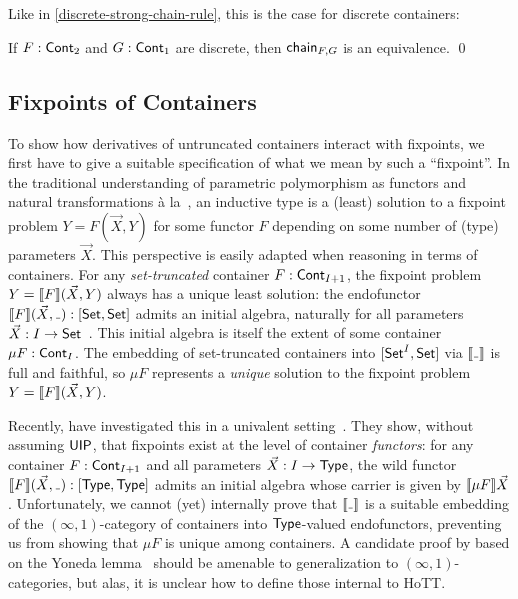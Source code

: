 Like in \autoref{discrete-strong-chain-rule}, this is the case for discrete containers:
\begin{proposition}\label{discrete-strong-binary-chain-rule}
  If \( F : \operatorname{\mathsf{Cont}}_{2} \) and \( G : \operatorname{\mathsf{Cont}}_{1} \) are discrete, then \( \operatorname{\mathsf{chain}}_{F,G} \) is an equivalence. \qed
\end{proposition}

\subsection{Fixpoints of Containers}\label{fixed-point-containers}

To show how derivatives of untruncated containers interact with fixpoints,
we first have to give a suitable specification of what we mean by such a \enquote{fixpoint}.
In the traditional understanding of parametric polymorphism as functors and natural transformations {\`a la}~\cite{BainbridgeEtAl1990Functorialpolymorphism},
an inductive type is a (least) solution to a fixpoint problem \( Y = F(\vec{X}, Y) \)
for some functor \( F \) depending on some number of (type) parameters \( \vec{X} \).
This perspective is easily adapted when reasoning in terms of containers.
For any \emph{set-truncated} container \( {F : \operatorname{\mathsf{Cont}}_{I+1}} \),
the fixpoint problem \( Y = \llbracket F\rrbracket(\vec{X}, Y) \) always has a unique least solution:
the endofunctor \( \Ext{F}(\vec{X}, \Blank) : [ \Set, \Set ] \) admits an initial algebra,
naturally for all parameters \( {\vec{X} : I \to \operatorname{\mathsf{Set}}} \)~\cite[Proposition~5.3]{AbbottEtAl2005ContainersConstructingstrictly}.
This initial algebra is itself the extent of some container \( \mu F : \operatorname{\mathsf{Cont}}_{I} \).
The embedding of set-truncated containers into \( [\operatorname{\mathsf{Set}}^I, \operatorname{\mathsf{Set}}] \) via \( \Ext{\Blank} \) is full and faithful,
so \( \mu F \) represents a \emph{unique} solution to the fixpoint problem \( Y = \llbracket F\rrbracket(\vec{X}, Y) \).

Recently,
\citeauthor{DamatoEtAl2025FormalisingInductiveCoinductive} have investigated this in a univalent setting~\cite{DamatoEtAl2025FormalisingInductiveCoinductive}.
They show, without assuming \( \mathsf{UIP} \), that fixpoints exist at the level of container \emph{functors}:
for any container \( F : \operatorname{\mathsf{Cont}}_{I + 1} \) and all parameters \( \vec{X} : I \to \operatorname{\mathsf{Type}} \),
the wild functor \( \Ext{ F }(\vec{X}, \Blank) : [\Type, \Type] \) admits an initial algebra
whose carrier is given by \( \llbracket \mu F \rrbracket\vec{X} \).
Unfortunately, we cannot (yet) internally prove that \( \Ext{\Blank} \) is a suitable embedding of the \( (\infty, 1) \)-category of containers
into \( \operatorname{\mathsf{Type}} \)-valued endofunctors, preventing us from showing that \( \mu F \) is unique among containers.
A candidate proof by \citeauthor{Damato2023RevisitingContainersCubical} based on the Yoneda lemma~\cite{Damato2023RevisitingContainersCubical}
should be amenable to generalization to \( (\infty, 1) \)-categories,
but alas, it is unclear how to define those internal to HoTT.

